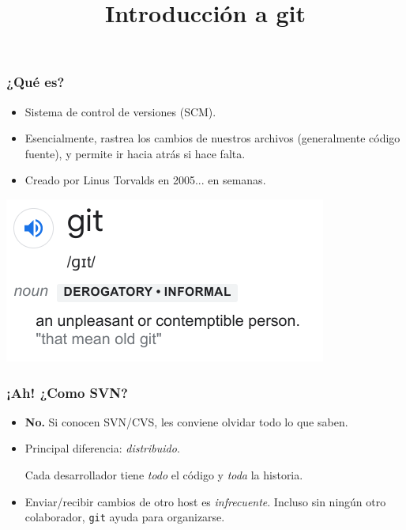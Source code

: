 \documentclass[a4paper, 12pt, aspectratio=169,
\ifhandout handout \else \fi
]{beamer}
\begin{document}
\title{Introducción a git}
\date{}

\begin{frame}
    \titlepage
\end{frame}

\newcommand{\backupbegin}{
   \newcounter{finalframe}
   \setcounter{finalframe}{\value{framenumber}}
}
\newcommand{\backupend}{
   \setcounter{framenumber}{\value{finalframe}}
}

\begin{frame}
    \frametitle{¿Qué es?}
    \begin{itemize}
        \item Sistema de control de versiones (SCM).
            \pause

        \item Esencialmente, rastrea los cambios de nuestros archivos
            (generalmente código fuente), y permite ir hacia atrás si hace falta.
            \pause

        \item Creado por Linus Torvalds en 2005...  \pause en semanas.
    \end{itemize}
    \pause

    \includegraphics[scale=0.5]{defn.png}
\end{frame}

\begin{frame}
    \frametitle{¡Ah! ¿Como SVN?}
    \begin{itemize}
        \item \textbf{No.} \pause
            Si conocen SVN/CVS, les conviene olvidar todo lo que saben.

            \pause
        \item Principal diferencia: \emph{distribuido}.
    \begin{mdframed}[
            linecolor=black,
            outerlinewidth=0,
            innertopmargin=10,
            innerbottommargin=10,
            leftmargin=1,
            rightmargin=1,
            roundcorner=1pt
            ]
        \begin{center}
            Cada desarrollador tiene \emph{todo} el código
            y \emph{toda} la historia.
        \end{center}
    \end{mdframed}
    \pause

    \item Enviar/recibir cambios de otro host es \emph{infrecuente}.
        Incluso sin ningún otro colaborador, \texttt{git} ayuda para organizarse.
    \end{itemize}
\end{frame}
\end{document}
